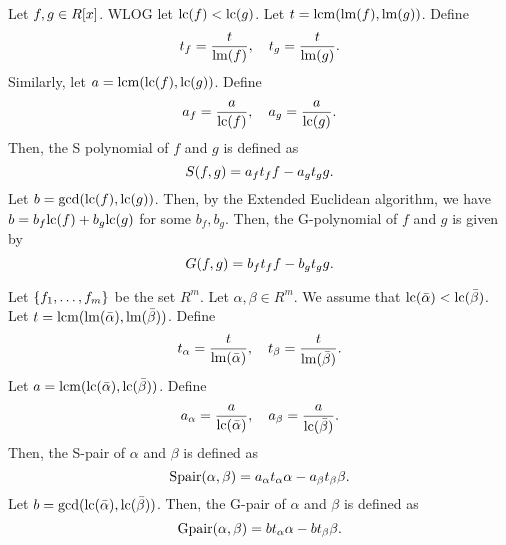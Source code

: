 \documentclass[twoside]{article}
\begin{document}
\begin{definition}[S/G-Polynomial]
    Let \(f, g \in R[x]\). WLOG let \(\mathrm{lc}(f) <
    \mathrm{lc}(g)\). Let \(t = \mathrm{lcm}(\mathrm{lm}(f),
    \mathrm{lm}(g))\). Define
    \begin{equation}
        t_f = \frac{t}{\mathrm{lm}(f)}, \quad
        t_g = \frac{t}{\mathrm{lm}(g)}.
    \end{equation}
    Similarly, let \(a = \mathrm{lcm}(\mathrm{lc}(f),
    \mathrm{lc}(g))\). Define
    \begin{equation}
        a_f = \frac{a}{\mathrm{lc}(f)}, \quad
        a_g = \frac{a}{\mathrm{lc}(g)}.
    \end{equation}
    Then, the S polynomial of \(f\) and \(g\) is defined as
    \begin{equation}
        S(f, g) = a_ft_ff - a_gt_gg.
    \end{equation}
    Let \(b = \gcd(\mathrm{lc}(f), \mathrm{lc}(g))\). Then, by
    the Extended Euclidean algorithm, we have \(b = b_f\mathrm{lc}(f) +
    b_g\mathrm{lc}(g)\) for some \(b_f, b_g\). Then, the G-polynomial of
    \(f\) and \(g\) is given by
    \begin{equation}
        G(f, g) = b_ft_ff - b_gt_gg.
    \end{equation}
\end{definition}

\begin{definition}[S/G-Pairs]
    Let \(\{f_1, \ldots, f_m\}\) be the set \(R^m\). Let \(\alpha, \beta \in
    R^m\). We assume that \(\mathrm{lc}(\bar{\alpha}) <
    \mathrm{lc}(\bar{\beta})\). Let \(t =
    \mathrm{lcm}(\mathrm{lm}(\bar{\alpha}),
    \mathrm{lm}(\bar{\beta}))\). Define
    \begin{equation}
        t_\alpha = \frac{t}{\mathrm{lm}(\bar{\alpha})}, \quad
        t_\beta = \frac{t}{\mathrm{lm}(\bar{\beta})}.
    \end{equation}
    Let \(a = \mathrm{lcm}(\mathrm{lc}(\bar{\alpha}),
    \mathrm{lc}(\bar{\beta}))\). Define
    \begin{equation}
        a_\alpha = \frac{a}{\mathrm{lc}(\bar{\alpha})}, \quad
        a_\beta = \frac{a}{\mathrm{lc}(\bar{\beta})}.
    \end{equation}
    Then, the S-pair of \(\alpha\) and \(\beta\) is defined as
    \begin{equation}
        \mathrm{Spair}(\alpha, \beta) = a_\alpha t_\alpha \alpha - a_\beta t_\beta \beta.
    \end{equation}
    Let \(b = \gcd(\mathrm{lc}(\bar{\alpha}),
    \mathrm{lc}(\bar{\beta}))\). Then, the G-pair of \(\alpha\) and
    \(\beta\) is defined as
    \begin{equation}
        \mathrm{Gpair}(\alpha, \beta) = b t_\alpha \alpha - b t_\beta \beta.
    \end{equation}
\end{definition}
\end{document}

